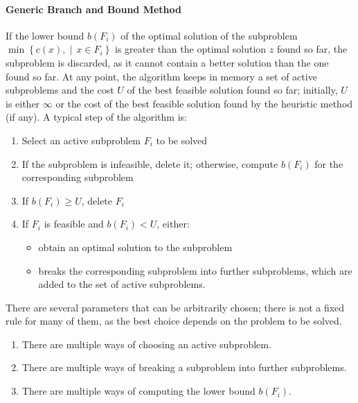 \paragraph*{Generic Branch and Bound Method}
If the lower bound $b(F_i)$ of the optimal solution of the subproblem $\min\left\{ c(x), \middle\vert\, x \in F_i \right\}$ is greater than the optimal solution $z$ found so far, the subproblem is discarded, as it cannot contain a better solution than the one found so far.
At any point, the algorithm keeps in memory a set of active subproblems and the cost $U$ of the best feasible solution found so far;
initially, $U$ is either $\infty$ or the cost of the best feasible solution found by the heuristic method (if any).
A typical step of the algorithm is:
\begin{enumerate}
    \item Select an active subproblem $F_i$ to be solved
    \item If the subproblem is infeasible, delete it; otherwise, compute $b(F_i)$ for the corresponding subproblem
    \item If $b(F_i) \geq U$, delete $F_i$
    \item If $F_i$ is feasible and $b(F_i) < U$, either:
        \begin{itemize}
            \item obtain an optimal solution to the subproblem
            \item breaks the corresponding subproblem into further subproblems, which are added to the set of active subproblems.
        \end{itemize}
\end{enumerate}

There are several parameters that can be arbitrarily chosen;
there is not a fixed rule for many of them, as the best choice depends on the problem to be solved.

\begin{enumerate}
    \item There are multiple ways of choosing an active subproblem.
    \item There are multiple ways of breaking a subproblem into further subproblems.
    \item There are multiple ways of computing the lower bound $b(F_i)$.
\end{enumerate}

